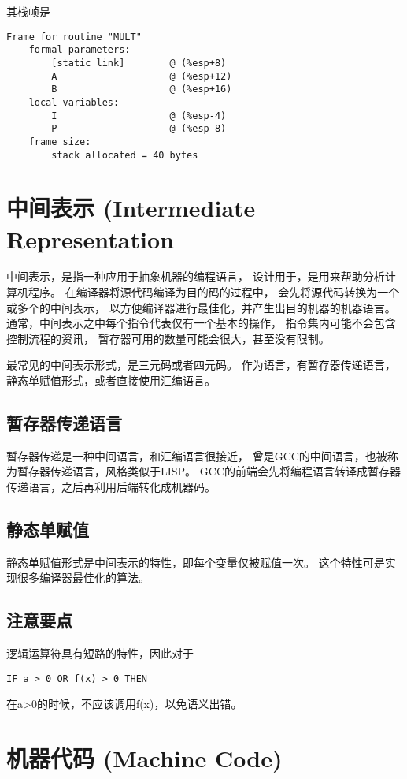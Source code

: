 ﻿\documentclass{article}
\begin{document}
其栈帧是
\begin{lstlisting}
Frame for routine "MULT"
    formal parameters:
        [static link]        @ (%esp+8)
        A                    @ (%esp+12)
        B                    @ (%esp+16)
    local variables:
        I                    @ (%esp-4)
        P                    @ (%esp-8)
    frame size:
        stack allocated = 40 bytes
\end{lstlisting}



\section{中间表示 (Intermediate Representation}
中间表示，是指一种应用于抽象机器的编程语言，
设计用于，是用来帮助分析计算机程序。
在编译器将源代码编译为目的码的过程中，
会先将源代码转换为一个或多个的中间表示，
以方便编译器进行最佳化，并产生出目的机器的机器语言。
通常，中间表示之中每个指令代表仅有一个基本的操作，
指令集内可能不会包含控制流程的资讯，
暂存器可用的数量可能会很大，甚至没有限制。

最常见的中间表示形式，是三元码或者四元码。
作为语言，有暂存器传递语言，静态单赋值形式，或者直接使用汇编语言。

\subsection{暂存器传递语言}
暂存器传递是一种中间语言，和汇编语言很接近，
曾是GCC的中间语言，也被称为暂存器传递语言，风格类似于LISP。
GCC的前端会先将编程语言转译成暂存器传递语言，之后再利用后端转化成机器码。

\subsection{静态单赋值}
静态单赋值形式是中间表示的特性，即每个变量仅被赋值一次。
这个特性可是实现很多编译器最佳化的算法。

\subsection{注意要点}
逻辑运算符具有短路的特性，因此对于
\begin{lstlisting}
IF a > 0 OR f(x) > 0 THEN 
\end{lstlisting}
在a>0的时候，不应该调用f(x)，以免语义出错。


\section{机器代码 (Machine Code)}
\end{document}
